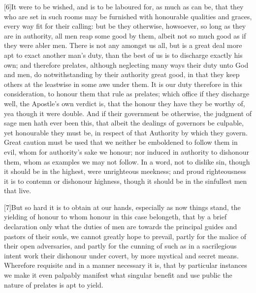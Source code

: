 [6]It were to be wished, and is to be laboured for, as much as can be, that they who are set in such rooms may be furnished with honourable qualities and graces, every way fit for their calling: but be they otherwise, howsoever, so long as they are in authority, all men reap some good by them, albeit not so much good as if they were abler men. There is not any amongst us all, but is a great deal more apt to exact another man’s duty, than the best of us is to discharge exactly his own; and therefore prelates, although neglecting many ways their duty unto God and men, do notwithstanding by their authority great good, in that they keep others at the leastwise in some awe under them. It is our duty therefore in this consideration, to honour them that rule as prelates; which office if they discharge well, the Apostle’s own verdict is, that the honour they have they be worthy of, yea though it were double. And if their government be otherwise, the judgment of sage men hath ever been this, that albeit the dealings of governors be culpable, yet honourable they must be, in respect of that Authority by which they govern. Great caution must be used that we neither be emboldened to follow them in evil, whom for authority’s sake we honour; nor induced in authority to dishonour them, whom as examples we may not follow. In a word, not to dislike sin, though it should be in the highest, were unrighteous meekness; and proud righteousness it is to contemn or dishonour highness, though it should be in the sinfullest men that live.

[7]But so hard it is to obtain at our hands, especially as now things stand, the yielding of honour to whom honour in this case belongeth, that by a brief declaration only what the duties of men are towards the principal guides and pastors of their souls, we cannot greatly hope to prevail, partly for the malice of their open adversaries, and partly for the cunning of such as in a sacrilegious intent work their dishonour under covert, by more mystical and secret means. Wherefore requisite and in a manner necessary it is, that by particular instances we make it even palpably manifest what singular benefit and use public the nature of prelates is apt to yield.


